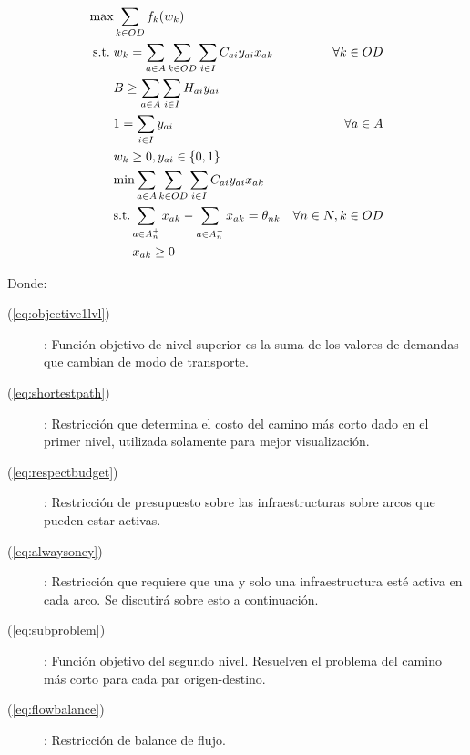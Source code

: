 \documentclass{article}
\newcommand{\modelspace}{\hspace{1.5em}}
\begin{document}
  \begin{align}
    \text{max}    & \sum_{k \in OD} f_k(w_k)                                                         & \label{eq:objective1lvl} \\
    \text{s.t.}\; & w_k = \sum_{a \in A} \sum_{k \in OD} \sum_{i \in I} C_{ai}y_{ai}x_{ak}           & \forall k \in OD \label{eq:shortestpath} \\
                  & B \geq \sum_{a \in A} \sum_{i \in I} H_{ai}y_{ai}                                & \label{eq:respectbudget} \\
                  & 1 = \sum_{i \in I} y_{ai}                                                        & \forall a \in A \label{eq:alwaysoney} \\
                  & w_k \geq 0, y_{ai} \in \{0,1\}                                                   & \nonumber \\
                  & \text{min} \sum_{a \in A} \sum_{k \in OD} \sum_{i \in I} C_{ai}y_{ai}x_{ak}      & \label{eq:subproblem} \\
                  & \text{s.t.} \sum_{a \in A_n^+} x_{ak} - \sum_{a \in A_n^-} x_{ak} = \theta_{nk}  & \forall n \in N, k \in OD \label{eq:flowbalance} \\
                  & \modelspace x_{ak} \geq 0                                                        & \nonumber
  \end{align}

  Donde:

  \begin{description}
    \item[(\ref{eq:objective1lvl})]: Función objetivo de nivel superior es la suma de los valores de demandas que cambian de modo de transporte.
    \item[(\ref{eq:shortestpath})]: Restricción que determina el costo del camino más corto dado en el primer nivel, utilizada solamente para mejor visualización.
    \item[(\ref{eq:respectbudget})]: Restricción de presupuesto sobre las infraestructuras sobre arcos que pueden estar activas.
    \item[(\ref{eq:alwaysoney})]: Restricción que requiere que una y solo una infraestructura esté activa en cada arco. Se discutirá sobre esto a continuación.
    \item[(\ref{eq:subproblem})]: Función objetivo del segundo nivel. Resuelven el problema del camino más corto para cada par origen-destino.
    \item[(\ref{eq:flowbalance})]: Restricción de balance de flujo.
  \end{description}
\end{document}
